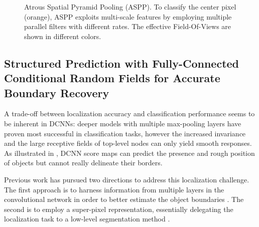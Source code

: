 \begin{figure}[!t]
  \centering
  \caption{Atrous Spatial Pyramid Pooling (ASPP). To classify the center pixel (orange),
    ASPP exploits multi-scale features by employing multiple parallel filters with
    different rates. The effective Field-Of-Views are shown in different colors.}
  \label{fig:aspp_fov}
\end{figure}

\subsection{Structured Prediction with Fully-Connected Conditional Random Fields for Accurate Boundary Recovery}
\label{sec:boundary-recovery}

A trade-off between localization accuracy and classification performance seems to be inherent in DCNNs:
deeper models with multiple max-pooling layers have
proven most successful in classification tasks, however the increased
invariance and the large receptive fields of top-level nodes can only yield smooth responses.
As illustrated in , DCNN score maps can
 predict the presence and rough position of objects but
cannot really delineate their borders. 

Previous work has pursued two directions to address this localization challenge.
The first approach is to harness information from multiple layers in the
convolutional network in order to better estimate the object boundaries
\cite{hariharan2014hypercolumns, long2014fully, eigen2014predicting}. The
second  is to employ a super-pixel representation, essentially
delegating the localization task to a low-level segmentation method
\cite{mostajabi2014feedforward}.


